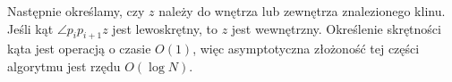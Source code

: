 Następnie określamy, czy $z$ należy do wnętrza lub zewnętrza
znalezionego klinu. Jeśli kąt $\angle p_{i}p_{i+1}z$ jest lewoskrętny,
to $z$ jest wewnętrzny. Określenie skrętności kąta jest operacją o
czasie $O(1)$, więc asymptotyczna złożoność tej części algorytmu jest
rzędu $O(\log N)$.











